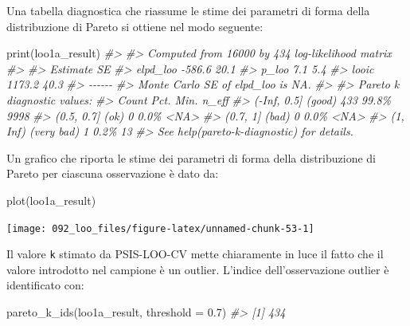 \documentclass[
  10pt,
  italian,
  a4paper,
  extrafontsizes,onecolumn,openright
  ]{memoir}
\newenvironment{Shaded}{\begin{snugshade}}{\end{snugshade}}
\newcommand{\AttributeTok}[1]{\textcolor[rgb]{0.77,0.63,0.00}{#1}}
\newcommand{\CommentTok}[1]{\textcolor[rgb]{0.56,0.35,0.01}{\textit{#1}}}
\newcommand{\FloatTok}[1]{\textcolor[rgb]{0.00,0.00,0.81}{#1}}
\newcommand{\FunctionTok}[1]{\textcolor[rgb]{0.00,0.00,0.00}{#1}}
\newcommand{\NormalTok}[1]{#1}
\theoremstyle{definition}
\theoremstyle{definition}
\theoremstyle{definition}
\theoremstyle{definition}
\theoremstyle{remark}
\begin{document}
\noindent
Una tabella diagnostica che riassume le stime dei parametri di forma della distribuzione di Pareto si ottiene nel modo seguente:

\begin{Shaded}
\begin{Highlighting}[]
\FunctionTok{print}\NormalTok{(loo1a\_result)}
\CommentTok{\#\textgreater{} }
\CommentTok{\#\textgreater{} Computed from 16000 by 434 log{-}likelihood matrix}
\CommentTok{\#\textgreater{} }
\CommentTok{\#\textgreater{}          Estimate   SE}
\CommentTok{\#\textgreater{} elpd\_loo   {-}586.6 20.1}
\CommentTok{\#\textgreater{} p\_loo         7.1  5.4}
\CommentTok{\#\textgreater{} looic      1173.2 40.3}
\CommentTok{\#\textgreater{} {-}{-}{-}{-}{-}{-}}
\CommentTok{\#\textgreater{} Monte Carlo SE of elpd\_loo is NA.}
\CommentTok{\#\textgreater{} }
\CommentTok{\#\textgreater{} Pareto k diagnostic values:}
\CommentTok{\#\textgreater{}                          Count Pct.    Min. n\_eff}
\CommentTok{\#\textgreater{} ({-}Inf, 0.5]   (good)     433   99.8\%   9998      }
\CommentTok{\#\textgreater{}  (0.5, 0.7]   (ok)         0    0.0\%   \textless{}NA\textgreater{}      }
\CommentTok{\#\textgreater{}    (0.7, 1]   (bad)        0    0.0\%   \textless{}NA\textgreater{}      }
\CommentTok{\#\textgreater{}    (1, Inf)   (very bad)   1    0.2\%   13        }
\CommentTok{\#\textgreater{} See help(\textquotesingle{}pareto{-}k{-}diagnostic\textquotesingle{}) for details.}
\end{Highlighting}
\end{Shaded}

\noindent
Un grafico che riporta le stime dei parametri di forma della distribuzione di Pareto per ciascuna osservazione è dato da:

\begin{Shaded}
\begin{Highlighting}[]
\FunctionTok{plot}\NormalTok{(loo1a\_result)}
\end{Highlighting}
\end{Shaded}

\begin{center}\texttt{[image: 092\_loo\_files/figure-latex/unnamed-chunk-53-1]} \end{center}

\noindent
Il valore \texttt{k} stimato da PSIS-LOO-CV mette chiaramente in luce il fatto che il valore introdotto nel campione è un outlier. L'indice dell'osservazione outlier è identificato con:

\begin{Shaded}
\begin{Highlighting}[]
\FunctionTok{pareto\_k\_ids}\NormalTok{(loo1a\_result, }\AttributeTok{threshold =} \FloatTok{0.7}\NormalTok{)}
\CommentTok{\#\textgreater{} [1] 434}
\end{Highlighting}
\end{Shaded}
\end{document}
